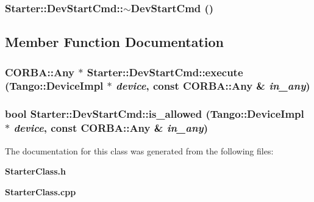 \subsubsection{\setlength{\rightskip}{0pt plus 5cm}Starter::Dev\-Start\-Cmd::$\sim$Dev\-Start\-Cmd ()\hspace{0.3cm}{\tt  [inline]}}\label{classStarter_1_1DevStartCmd_a2}




\subsection{Member Function Documentation}
\subsubsection{\setlength{\rightskip}{0pt plus 5cm}CORBA::Any $\ast$ Starter::Dev\-Start\-Cmd::execute (Tango::Device\-Impl $\ast$ {\em device}, const CORBA::Any \& {\em in\_\-any})\hspace{0.3cm}{\tt  [virtual]}}\label{classStarter_1_1DevStartCmd_a4}


\subsubsection{\setlength{\rightskip}{0pt plus 5cm}bool Starter::Dev\-Start\-Cmd::is\_\-allowed (Tango::Device\-Impl $\ast$ {\em device}, const CORBA::Any \& {\em in\_\-any})\hspace{0.3cm}{\tt  [virtual]}}\label{classStarter_1_1DevStartCmd_a3}




The documentation for this class was generated from the following files:\begin{CompactItemize}
\item 
{\bf Starter\-Class.h}\item 
{\bf Starter\-Class.cpp}\end{CompactItemize}
